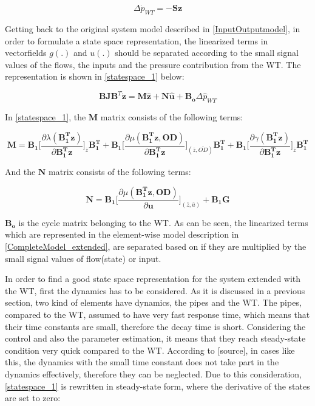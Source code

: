 \begin{equation}
\Delta \dot{p}_{WT} = - \pmb{S} \pmb{z}
 \label{currentlaw_4}
\end{equation}

Getting back to the original system model described in \eqref{InputOutputmodel}, in order to formulate a state space representation, the linearized terms in  vectorfields $g(.)$ and $u(.)$ should be separated according to the small signal values of the flows, the inputs and the pressure contribution from the WT. The representation is shown in \eqref{statespace_1} below: 

\begin{equation}
 \pmb{B}\pmb{J {B}}^T \pmb{\dot{z}} = \pmb{M} \pmb{\hat{z}} + \pmb{N} \pmb{\hat{u}} + \pmb{B_o} \Delta \hat{p}_{WT}    
 \label{statespace_1}
\end{equation}

In \eqref{statespace_1}, the $\pmb{M}$ matrix consists of the following terms: 

\begin{equation}
  \pmb{M} = \pmb{B_1} \bigg[ \frac{\partial{\lambda(\pmb{{B_1^{T}}}\pmb{z})}}{{\partial{\pmb{{B_1^{T}}}\pmb{z}}}}   \bigg]_{\bar{z}} \pmb{{B_1^{T}}} +  \pmb{B_1} \bigg[ \frac{\partial{\mu(\pmb{{B_1^{T}}}\pmb{z}, \pmb{OD})}}{{\partial{\pmb{{B_1^{T}}}\pmb{z}}}}  \bigg]_{(\bar{z}, \bar{OD})} \pmb{{B_1^{T}}} +  \pmb{B_1} \bigg[ \frac{\partial{\gamma(\pmb{{B_1^{T}}}\pmb{z})}}{{\partial{\pmb{{B_1^{T}}}\pmb{z}}}}   \bigg]_{\bar{z}} \pmb{{B_1^{T}}}
\label{Amatrix}
\end{equation}

And the $\pmb{N}$ matrix consists of the following terms:

\begin{equation}
  \pmb{N} = \pmb{B_1} \bigg[ \frac{\partial{\mu(\pmb{{B_1^{T}}}\pmb{z}, \pmb{OD})}}{{\partial{\pmb{u}}}}  \bigg]_{(\bar{z}, \bar{u})} + \pmb{B_1}\pmb{G}  
\label{Bumatrix}
\end{equation}

$\pmb{B_o}$ is the cycle matrix belonging to the WT. As can be seen, the linearized terms which are represented in the element-wise model description in \eqref{CompleteModel_extended}, are separated based on if they are multiplied by the small signal values of flow(state) or input. 

In order to find a good state space representation for the system extended with the WT, first the dynamics has to be considered. As it is discussed in a previous section, two kind of elements have dynamics, the pipes and the WT. The pipes, compared to the WT, assumed to have very fast response time, which means that their time constants are small, therefore the decay time is short. Considering the control and also the parameter estimation, it means that they reach steady-state condition very quick compared to the WT. According to [source], in cases like this, the dynamics with the small time constant does not take part in the dynamics effectively, therefore they can be neglected. Due to this consideration, \eqref{statespace_1} is rewritten in steady-state form, where the derivative of the states are set to zero:

